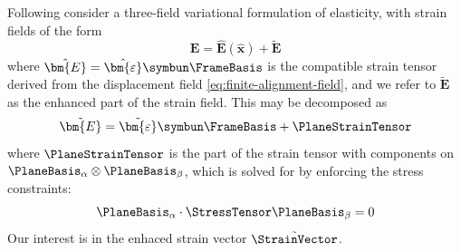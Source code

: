 

Following \cite{simo1986variational,simo1990class,simo1992geometrically}
consider a three-field variational formulation of elasticity, with strain fields of the form 
\begin{equation*}
\bm{E} = \hat{\bm{E}}(\hat{\bm{x}}) + \tilde{\bm{E}}
\end{equation*}
where \(\hat{\bm{E}} = \hat{\bm{\varepsilon}}\symbun\FrameBasis\) is the compatible strain tensor derived from the displacement field \cref{eq:finite-alignment-field}, and we refer to $\tilde{\bm{E}}$ as the enhanced part of the strain field. 
This may be decomposed as
\begin{equation*}
\tilde{\bm{E}} = \tilde{\bm{\varepsilon}} \symbun \FrameBasis + \PlaneStrainTensor
\end{equation*}
where \(\PlaneStrainTensor\) is the part of the strain tensor with components on \(\PlaneBasis_{\alpha}\otimes \PlaneBasis_{\beta}\), which is solved for by enforcing the stress constraints:
\[
\PlaneBasis_{\alpha} \cdot \StressTensor \PlaneBasis_{\beta} = 0
\]
Our interest is in the enhaced strain vector \(\tilde{\StrainVector}\). 

